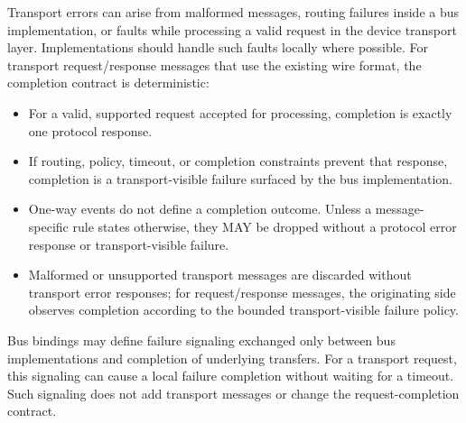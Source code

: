 Transport errors can arise from malformed messages, routing failures inside a
bus implementation, or faults while processing a valid request in the device
transport layer.
Implementations should handle such faults locally where possible. For
transport request/response messages that use the existing wire format, the
completion contract is deterministic:
\begin{itemize}
  \item For a valid, supported request accepted for processing, completion is
        exactly one protocol response.
  \item If routing, policy, timeout, or completion constraints prevent that
        response, completion is a transport-visible failure surfaced by the
        bus implementation.
  \item One-way events do not define a completion outcome. Unless a
        message-specific rule states otherwise, they MAY be dropped without a
        protocol error response or transport-visible failure.
  \item Malformed or unsupported transport messages are discarded without
        transport error responses; for request/response messages, the
        originating side observes completion according to the bounded
        transport-visible failure policy.
\end{itemize}

Bus bindings may define failure signaling exchanged only between bus
implementations and completion of underlying transfers. For a transport
request, this signaling can cause a local failure completion without waiting
for a timeout. Such signaling does not add transport messages or change the
request-completion contract.

